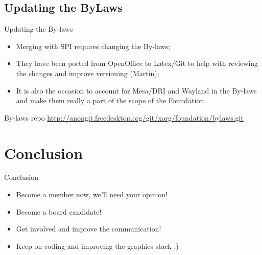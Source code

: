 \documentclass{beamer}
\begin{document}
		\subsection{Updating the ByLaws}
		\begin{frame}
			\begin{block}{Updating the By-laws}
				\begin{itemize}
					\item Merging with SPI requires changing the By-laws;
					\item They have been ported from OpenOffice to Latex/Git to help with
reviewing the changes and improve versioning (Martin);
					\item It is also the occasion to account for 
Mesa/DRI and Wayland in the By-laws and make them really a part of the scope of the Foundation.
				\end{itemize}
			\end{block}

			\begin{block}{By-laws repo}
				\url{http://anongit.freedesktop.org/git/xorg/foundation/bylaws.git}
			\end{block}
		\end{frame}

	\section{Conclusion}
		\begin{frame}
			\begin{block}{Conclusion}
				\begin{itemize}
					\item Become a member now, we'll need your opinion!
					\item Become a board candidate!
					\item Get involved and improve the communication!
					\item Keep on coding and improving the graphics stack ;)
				\end{itemize}
			\end{block}
		\end{frame}
\end{document}
